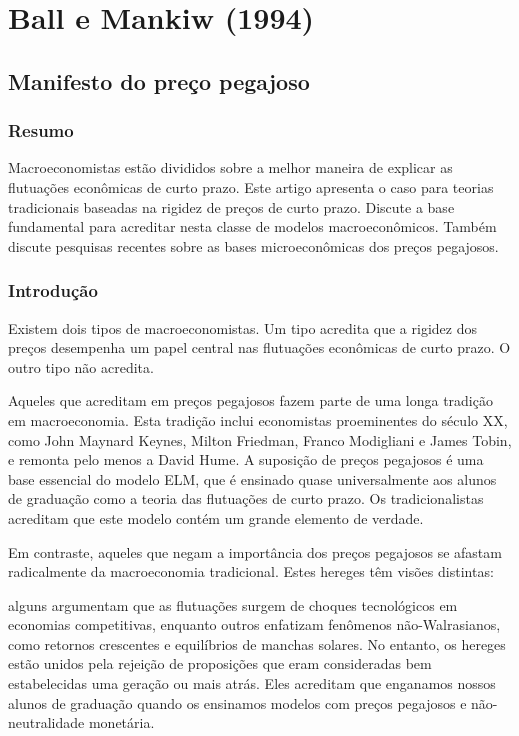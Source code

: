 \documentclass[12pt]{article}
\begin{document}
\section{\textbf{Ball e Mankiw (1994)}}
\subsection{\textbf{Manifesto do preço pegajoso}}
\subsubsection{\textbf{Resumo}}

Macroeconomistas estão divididos sobre a melhor maneira de explicar as flutuações econômicas de curto prazo. Este artigo apresenta o caso para teorias tradicionais baseadas na rigidez de preços de curto prazo. Discute a base fundamental para acreditar nesta classe de modelos macroeconômicos. Também discute pesquisas recentes sobre as bases microeconômicas dos preços pegajosos.

\subsubsection{\textbf{Introdução}}
Existem dois tipos de macroeconomistas. Um tipo acredita que a rigidez dos preços desempenha um papel central nas flutuações econômicas de curto prazo. O outro tipo não acredita.

Aqueles que acreditam em preços pegajosos fazem parte de uma longa tradição em macroeconomia. Esta tradição inclui economistas proeminentes do século XX, como John Maynard Keynes, Milton Friedman, Franco Modigliani e James Tobin, e remonta pelo menos a David Hume. A suposição de preços pegajosos é uma base essencial do modelo ELM, que é ensinado quase universalmente aos alunos de graduação como a teoria das flutuações de curto prazo. Os tradicionalistas acreditam que este modelo contém um grande elemento de verdade.

Em contraste, aqueles que negam a importância dos preços pegajosos se afastam radicalmente da macroeconomia tradicional. Estes hereges têm visões distintas:

alguns argumentam que as flutuações surgem de choques tecnológicos em economias competitivas, enquanto outros enfatizam fenômenos não-Walrasianos, como retornos crescentes e equilíbrios de manchas solares. No entanto, os hereges estão unidos pela rejeição de proposições que eram consideradas bem estabelecidas uma geração ou mais atrás. Eles acreditam que enganamos nossos alunos de graduação quando os ensinamos modelos com preços pegajosos e não-neutralidade monetária.
\end{document}
